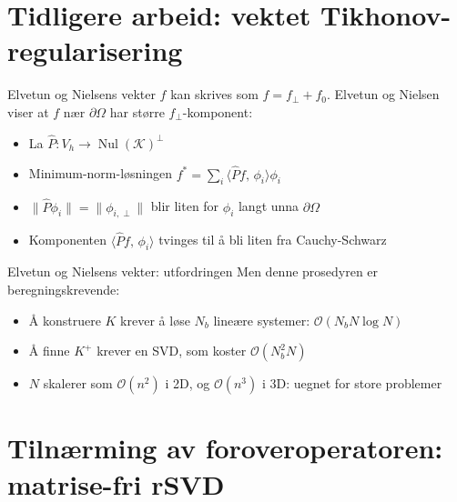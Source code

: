 \documentclass[aspectratio=169]{beamer}
\begin{document}
\section{Tidligere arbeid: vektet Tikhonov-regularisering}

\begin{frame}{Elvetun og Nielsens vekter}
$f$ kan skrives som $f = f_\perp + f_0$. Elvetun og Nielsen viser at $f$ nær $\partial \Omega$ har større $f_\perp$-komponent:
\begin{itemize}
  \item<2-> La $\hat P: V_h \to \operatorname{Nul}(\mathcal{K})^\perp$
  \item<3-> Minimum-norm-løsningen $f^* = \sum_i \langle \hat P f,\, \phi_i \rangle \phi_i$
  \item<4-> $\| \hat P \phi_i \| = \| \phi_{i,\perp} \|$ blir liten for $\phi_i$ langt unna $\partial \Omega$
  \item<5-> Komponenten $\langle \hat P f,\, \phi_i \rangle$ tvinges til å bli liten fra Cauchy-Schwarz
\end{itemize}
\end{frame}


\begin{frame}{Elvetun og Nielsens vekter: utfordringen}
Men denne prosedyren er beregningskrevende:
\begin{itemize}
  \item<2-> Å konstruere $K$ krever å løse $N_b$ lineære systemer: $\mathcal{O}(N_b N \log N)$
  \item<3-> Å finne $K^+$ krever en SVD, som koster $\mathcal{O}(N_b^2 N)$
  \item<4-> $N$ skalerer som $\mathcal{O}(n^2)$ i 2D, og $\mathcal{O}(n^3)$ i 3D: uegnet for store problemer
\end{itemize}
\end{frame}


\section{Tilnærming av foroveroperatoren: matrise-fri rSVD}
\end{document}
